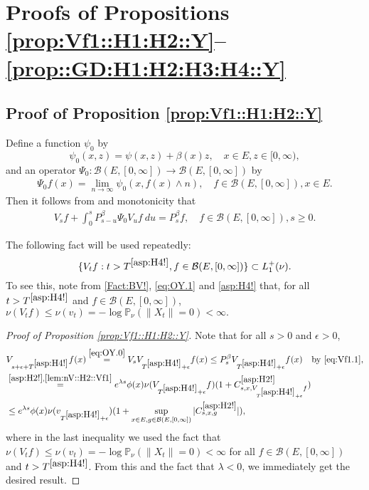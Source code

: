 \documentclass[12pt,a4paper]{amsart}
\numberwithin{equation}{section}
\theoremstyle{plain}
\theoremstyle{definition}
\theoremstyle{remark}
\begin{document}
\section{Proofs of Propositions \ref{prop:Vf1::H1:H2::Y}--\ref{prop::GD:H1:H2:H3:H4::Y}}
\subsection{Proof of Proposition \ref{prop:Vf1::H1:H2::Y}} \label{sec:Vf1}
	Define a function $\psi_0$ by
\[
	\psi_0(x,z) = \psi(x,z)+ \beta(x) z, \quad x\in E, z\in [0,\infty),
\]	
	and an operator $\Psi_0: \mathcal B(E, [0,\infty]) \to \mathcal B(E,[0,\infty])$ by
\begin{align}
	\Psi_0 f(x)
	= \lim_{n\to \infty} \psi_0(x,f(x) \wedge n),
	\quad f\in \mathcal B(E,[0,\infty]), x\in E.
\end{align}
	Then it follows from \cite[Theorem 2.23]{Li2011MeasureValued} and monotonicity that
\begin{align}\label{eq:Vf1.1}
	V_s f + \int_0^s P_{s-u}^\beta \Psi_0 V_{u} f ~du
	= P_s^\beta f,
	\quad f\in \mathcal B(E,[0,\infty]), s\geq 0.
\end{align}

	The following fact will be used repeatedly:
\begin{equation} \label{lem:nV::H2::Vf1}
	\{V_tf:t> T^{\eqref{asp:H4!}}, f\in \mathcal B(E, [0,\infty])\}\subset L_1^+(\nu).
\end{equation}
	To see this, note from \eqref{Fact:BV!}, \eqref{eq:OY.1} and \eqref{asp:H4!} that, for  all $t> T^{\eqref{asp:H4!}}$ and $f\in \mathcal B(E,[0,\infty])$, $\nu(V_t f) \leq \nu(v_t)   = - \log \mathbb P_\nu (\|X_t\| = 0)  < \infty. $

\begin{proof}[{Proof of Proposition \ref{prop:Vf1::H1:H2::Y}}]
	Note that for all $s>0$ and $\epsilon>0$,
\begin{align}
	& V_{s+\epsilon +T^{\eqref{asp:H4!}}} f (x)
	\overset{\eqref{eq:OY.0}}= V_s V_{T^{\eqref{asp:H4!}}+\epsilon} f(x)
	\leq P_s^\beta V_{T^{\eqref{asp:H4!}} + \epsilon} f(x)\quad\text{by \eqref{eq:Vf1.1}},
 	\\ \label{eq:Vf1.2} & \overset{\eqref{asp:H2!},\eqref{lem:nV::H2::Vf1}}= e^{\lambda s}\phi(x) \nu( V_{T^{\eqref{asp:H4!}} +\epsilon} f)  (1+ C^{\eqref{asp:H2!}}_{s,x,V_{T^{\eqref{asp:H4!}} + \epsilon} f})
	\\&\leq e^{\lambda s}\phi(x) \nu(v_{T^{\eqref{asp:H4!}} +\epsilon})  (1+ \sup_{x\in E, g\in \mathcal B(E,[0,\infty])}|C^{\eqref{asp:H2!}}_{s,x,g}|),
\end{align}
	where
	in the last inequality we used the fact that $\nu(V_t f) \leq \nu(v_t)   = - \log \mathbb P_\nu (\|X_t\| = 0)  < \infty$  
	for all  $f\in \mathcal B(E,[0,\infty])$ and $t > T^{\eqref{asp:H4!}}$.
	From this and the fact that $\lambda < 0$, we immediately get the desired result.
\end{proof}
\end{document}
